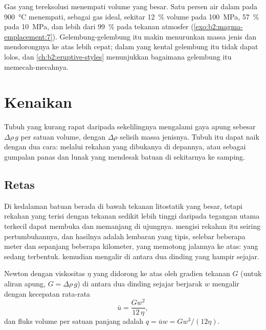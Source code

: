Gas yang tereksolusi menempati volume yang besar. Satu persen air dalam  pada
\qty{900}{\celsius} menempati, sebagai gas ideal, sekitar \qty{12}{\percent}
volume pada \qty{100}{MPa}, \qty{57}{\percent} pada \qty{10}{MPa}, dan lebih dari
\qty{99}{\percent} pada tekanan atmosfer (\cref{exo:b2:magma-emplacement:7}). Gelembung-gelembung itu
makin menurunkan massa jenis  dan mendorongnya ke atas lebih cepat; dalam  yang kental
gelembung itu tidak dapat lolos, dan \cref{ch:b2:eruptive-styles} menunjukkan bagaimana gelembung itu memecah-mecahnya.

\section{Kenaikan}

Tubuh  yang kurang rapat daripada sekelilingnya mengalami gaya apung sebesar
$\Delta\rho\,g$ per satuan volume, dengan $\Delta\rho$ selisih massa jenisnya. Tubuh itu
dapat naik dengan dua cara: melalui rekahan yang dibukanya di depannya, atau sebagai gumpalan
panas dan lunak yang mendesak batuan di sekitarnya ke samping.

\subsection{Retas}

Di kedalaman batuan berada di bawah tekanan litostatik yang besar, tetapi rekahan yang terisi
 dengan tekanan sedikit lebih tinggi daripada tegangan utama terkecil dapat
membuka dan memanjang di ujungnya.  mengisi rekahan itu seiring pertumbuhannya, dan hasilnya
adalah lembaran  yang tipis, selebar beberapa meter dan sepanjang beberapa kilometer, yang memotong jalannya
ke atas:  yang sedang terbentuk.  kemudian mengalir di antara dua dinding yang hampir
sejajar.

\begin{proposition}\label{prop:b2:magma-emplacement:poiseuille}
 Newton dengan viskositas $\eta$ yang didorong ke atas oleh gradien tekanan $G$
(untuk aliran apung, $G = \Delta\rho\,g$) di antara dua dinding sejajar berjarak $w$
mengalir dengan kecepatan rata-rata
\[
\bar u = \frac{G w^2}{12\,\eta},
\]
dan fluks volume per satuan panjang  adalah $q = \bar u w = G w^3/(12\eta)$.
\end{proposition}

